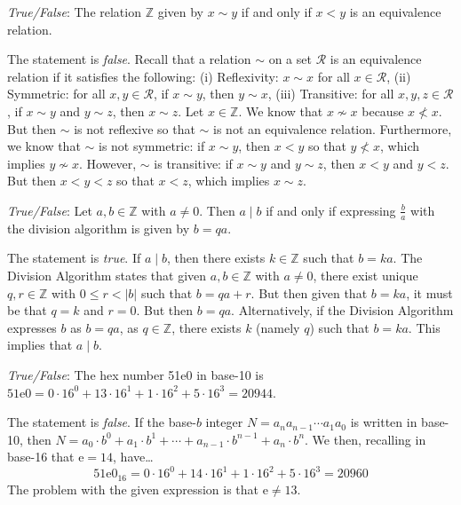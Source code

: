 \documentclass[11pt,letterpaper]{article}
\begin{document}
\quizsol \textit{True/False}: The relation $\mathbb{Z}$ given by $x \sim y$ if and only if $x < y$ is an equivalence relation. \pspace

\sol The statement is \textit{false}. Recall that a relation $\sim$ on a set $\mathcal{R}$ is an equivalence relation if it satisfies the following: (i) Reflexivity: $x \sim x$ for all $x \in \mathcal{R}$, (ii) Symmetric: for all $x, y \in \mathcal{R}$, if $x \sim y$, then $y \sim x$, (iii) Transitive: for all $x, y, z \in \mathcal{R}$, if $x \sim y$ and $y \sim z$, then $x \sim z$. Let $x \in \mathbb{Z}$. We know that $x \not\sim x$ because $x \not< x$. But then $\sim$ is not reflexive so that $\sim$ is not an equivalence relation. Furthermore, we know that $\sim$ is not symmetric: if $x \sim y$, then $x < y$ so that $y \not< x$, which implies $y \not\sim x$. However, $\sim$ is transitive: if $x \sim y$ and $y \sim z$, then $x < y$ and $y < z$. But then $x < y < z$ so that $x < z$, which implies $x \sim z$. \pvspace{1.3cm}



\newpage



\quizsol \textit{True/False}: Let $a, b \in \mathbb{Z}$ with $a \neq 0$. Then $a \mid b$ if and only if expressing $\frac{b}{a}$ with the division algorithm is given by $b= qa$. \pspace

\sol The statement is \textit{true}. If $a \mid b$, then there exists $k \in \mathbb{Z}$ such that $b= ka$. The Division Algorithm states that given $a, b \in \mathbb{Z}$ with $a \neq 0$, there exist unique $q, r \in \mathbb{Z}$ with $0 \leq r < |b|$ such that $b= qa + r$. But then given that $b= ka$, it must be that $q= k$ and $r= 0$. But then $b= qa$. Alternatively, if the Division Algorithm expresses $b$ as $b= qa$, as $q \in \mathbb{Z}$, there exists $k$ (namely $q$) such that $b= ka$. This implies that $a \mid b$. \pvspace{1.3cm}



\quizsol \textit{True/False}: The hex number 51e0 in base-10 is $\text{51e0}= 0 \cdot 16^0 + 13 \cdot 16^1 + 1 \cdot 16^2 + 5 \cdot 16^3= 20944$. \pspace

\sol The statement is \textit{false}. If the base-$b$ integer $N= a_n a_{n-1}\cdots a_1 a_0$ is written in base-10, then $N= a_0 \cdot b^0 + a_1 \cdot b^1 + \cdots + a_{n-1} \cdot b^{n-1} + a_n \cdot b^n$. We then, recalling in base-16 that $\text{e}= 14$, have\dots
	\[
	\text{51e0}_{16}= 0 \cdot 16^0 + 14 \cdot 16^1 + 1 \cdot 16^2 + 5 \cdot 16^3= 20960
	\]
The problem with the given expression is that $\text{e} \neq 13$. \pvspace{1.3cm}
\end{document}
